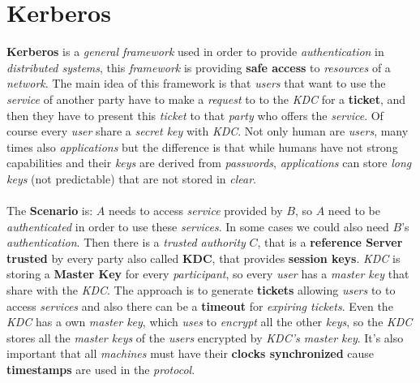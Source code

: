 \documentclass{article}
\begin{document}
\section{Kerberos}
\textbf{Kerberos} is a \emph{general framework} used in order to provide \emph{authentication} in \emph{distributed systems}, this \emph{framework} is providing \textbf{safe access} to \emph{resources} of a \emph{network}. The main idea of this framework is that \emph{users} that want to use the \emph{service} of another party have to make a \emph{request} to to the \emph{KDC} for a \textbf{ticket}, and then they have to present this \emph{ticket} to that \emph{party} who offers the \emph{service}. Of course every \emph{user} share a \emph{secret key} with \emph{KDC}. Not only human are \emph{users}, many times also \emph{applications} but the difference is that while humans have not strong capabilities and their \emph{keys} are derived from \emph{passwords}, \emph{applications} can store \emph{long keys} (not predictable) that are not stored in \emph{clear}. \\\\
The \textbf{Scenario} is: $A$ needs to access \emph{service} provided by $B$, so $A$ need to be \emph{authenticated} in order to use these \emph{services}. In some cases we could also need $B$'s \emph{authentication}. Then there is a \emph{trusted authority} $C$, that is a \textbf{reference Server trusted }by every party also called \textbf{KDC}, that provides \textbf{session keys}. \emph{KDC} is storing a \textbf{Master Key} for every \emph{participant}, so every \emph{user} has a \emph{master key} that share with the \emph{KDC}. The approach is to generate \textbf{tickets} allowing \emph{users} to to access \emph{services} and also there can be a \textbf{timeout} for \emph{expiring tickets}. Even the \emph{KDC} has a own \emph{master key}, which \emph{uses} to \emph{encrypt} all the other \emph{keys}, so the \emph{KDC} stores all the \emph{master keys} of the \emph{users} encrypted by \emph{KDC's master key}. It's also important that all \emph{machines} must have their \textbf{clocks synchronized} cause \textbf{timestamps} are used in the \emph{protocol}. 
\end{document}
